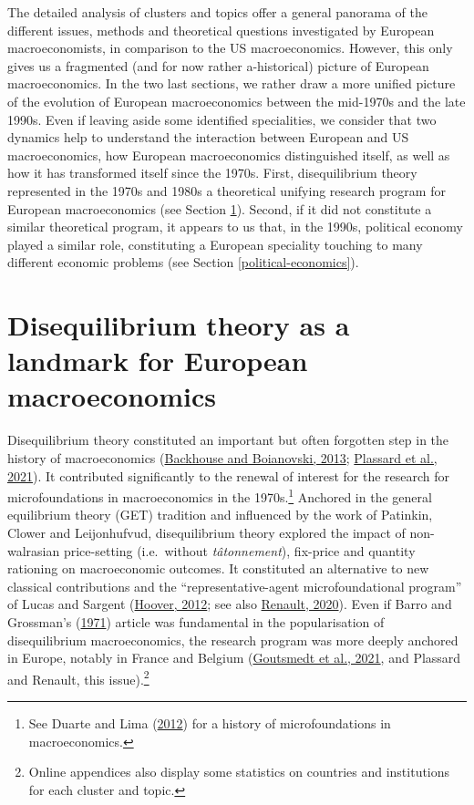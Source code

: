\documentclass[
  12pt,
  onecolumn]{article}
\begin{document}
The detailed analysis of clusters and topics offer a general panorama of
the different issues, methods and theoretical questions investigated by
European macroeconomists, in comparison to the US macroeconomics.
However, this only gives us a fragmented (and for now rather
a-historical) picture of European macroeconomics. In the two last
sections, we rather draw a more unified picture of the evolution of
European macroeconomics between the mid-1970s and the late 1990s. Even
if leaving aside some identified specialities, we consider that two
dynamics help to understand the interaction between European and US
macroeconomics, how European macroeconomics distinguished itself, as
well as how it has transformed itself since the 1970s. First,
disequilibrium theory represented in the 1970s and 1980s a theoretical
unifying research program for European macroeconomics (see Section
\ref{disequilibrium}). Second, if it did not constitute a similar
theoretical program, it appears to us that, in the 1990s, political
economy played a similar role, constituting a European speciality
touching to many different economic problems (see Section
\ref{political-economics}).

\hypertarget{disequilibrium}{%
\section{Disequilibrium theory as a landmark for European
macroeconomics}\label{disequilibrium}}

Disequilibrium theory constituted an important but often forgotten step
in the history of macroeconomics
(\protect\hyperlink{ref-backhouseboianovski2013}{Backhouse and
Boianovski, 2013}; \protect\hyperlink{ref-plassard2021}{Plassard et al.,
2021}). It contributed significantly to the renewal of interest for the
research for microfoundations in macroeconomics in the 1970s.\footnote{See
  Duarte and Lima (\protect\hyperlink{ref-duartelima2012a}{2012}) for a
  history of microfoundations in macroeconomics.} Anchored in the
general equilibrium theory (GET) tradition and influenced by the work of
Patinkin, Clower and Leijonhufvud, disequilibrium theory explored the
impact of non-walrasian price-setting (i.e.~without \emph{tâtonnement}),
fix-price and quantity rationing on macroeconomic outcomes. It
constituted an alternative to new classical contributions and the
``representative-agent microfoundational program'' of Lucas and Sargent
(\protect\hyperlink{ref-hoover2012}{Hoover, 2012}; see also
\protect\hyperlink{ref-renault2020a}{Renault, 2020}). Even if Barro and
Grossman's (\protect\hyperlink{ref-barro1971}{1971}) article was
fundamental in the popularisation of disequilibrium macroeconomics, the
research program was more deeply anchored in Europe, notably in France
and Belgium (\protect\hyperlink{ref-goutsmedt2021}{Goutsmedt et al.,
2021}, and Plassard and Renault, this issue).\footnote{Online appendices
  also display some statistics on countries and institutions for each
  cluster and topic.}
\end{document}
